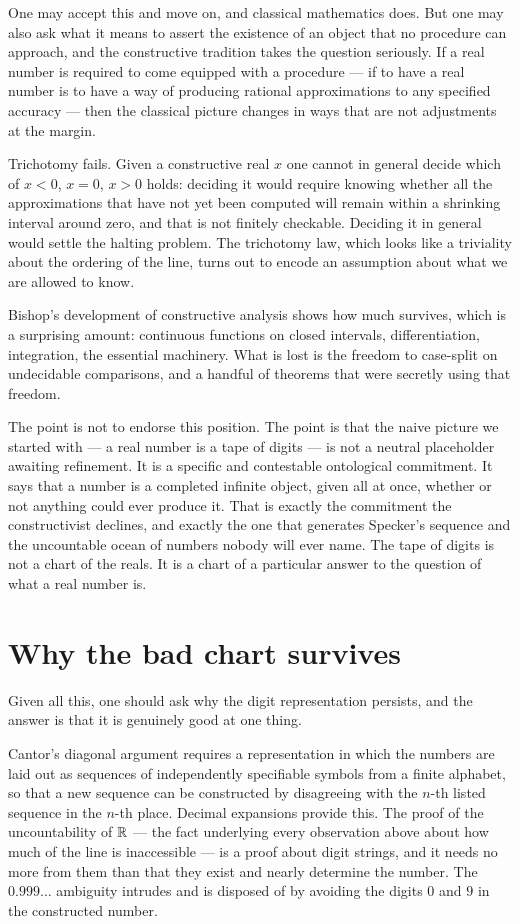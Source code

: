 \documentclass{essay}
\begin{document}
One may accept this and move on, and classical mathematics does. But one may
also ask what it means to assert the existence of an object that no procedure
can approach, and the constructive tradition takes the question seriously. If a
real number is required to come equipped with a procedure --- if to have a real
number is to have a way of producing rational approximations to any specified
accuracy --- then the classical picture changes in ways that are not
adjustments at the margin.

Trichotomy fails. Given a constructive real $x$ one cannot in general decide
which of $x < 0$, $x = 0$, $x > 0$ holds: deciding it would require knowing
whether all the approximations that have not yet been computed will remain
within a shrinking interval around zero, and that is not finitely checkable.
Deciding it in general would settle the halting problem. The trichotomy law,
which looks like a triviality about the ordering of the line, turns out to
encode an assumption about what we are allowed to know.

Bishop's development of constructive analysis shows how much survives, which is
a surprising amount: continuous functions on closed intervals, differentiation,
integration, the essential machinery. What is lost is the freedom to case-split
on undecidable comparisons, and a handful of theorems that were secretly using
that freedom.

The point is not to endorse this position. The point is that the naive picture
we started with --- a real number is a tape of digits --- is not a neutral
placeholder awaiting refinement. It is a specific and contestable ontological
commitment. It says that a number is a completed infinite object, given all at
once, whether or not anything could ever produce it. That is exactly the
commitment the constructivist declines, and exactly the one that generates
Specker's sequence and the uncountable ocean of numbers nobody will ever name.
The tape of digits is not a chart of the reals. It is a chart of a particular
answer to the question of what a real number is.

\section{Why the bad chart survives}

Given all this, one should ask why the digit representation persists, and the
answer is that it is genuinely good at one thing.

Cantor's diagonal argument requires a representation in which the numbers are
laid out as sequences of independently specifiable symbols from a finite
alphabet, so that a new sequence can be constructed by disagreeing with the
$n$-th listed sequence in the $n$-th place. Decimal expansions provide this. The
proof of the uncountability of $\mathbb{R}$ --- the fact underlying every observation
above about how much of the line is inaccessible --- is a proof about digit
strings, and it needs no more from them than that they exist and nearly
determine the number. The $0.999\ldots$ ambiguity intrudes and is disposed of by
avoiding the digits $0$ and $9$ in the constructed number.
\end{document}
